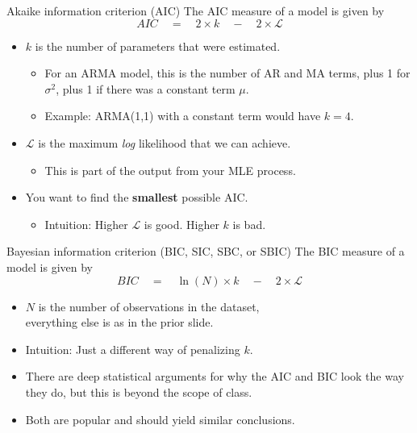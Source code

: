 \documentclass[t,12pt]{beamer}
\begin{document}
\begin{frame}[c]{Akaike information criterion (AIC)}
The AIC measure of a model is given by
$$
AIC \quad = \quad 2 \times k \quad - \quad 2 \times \mathscr{L}
$$
\begin{itemize}
\vspace{-0.2in}
\item $k$ is the number of parameters that were estimated.
\begin{itemize}
\item For an ARMA model, this is the number of AR and MA terms, plus 1 for $\sigma^2$, plus 1 if there was a constant term $\mu$.
\item Example: ARMA(1,1) with a constant term would have $k=4$.
\end{itemize}
\medskip
\item $\mathscr{L}$ is the maximum \emph{log} likelihood that we can achieve.
\begin{itemize}
\item This is part of the output from your MLE process.
\end{itemize}
\medskip
\item You want to find the \textbf{smallest} possible AIC.
\begin{itemize}
\item Intuition: Higher $\mathscr{L}$ is good. Higher $k$ is bad.
\end{itemize}
\end{itemize}
\end{frame}

\begin{frame}[c]{Bayesian information criterion (BIC, SIC, SBC, or SBIC)}
The BIC measure of a model is given by
$$
BIC \quad = \quad \ln(N) \times k \quad - \quad 2 \times \mathscr{L}
$$
\begin{itemize}
\vspace{-0.2in}
\item $N$ is the number of observations in the dataset,
\\ everything else is as in the prior slide.
\medskip
\item Intuition: Just a different way of penalizing $k$.
\medskip 
\item There are deep statistical arguments for why the AIC and BIC look the way they do, but this is beyond the scope of class.
\medskip
\item Both are popular and should yield similar conclusions.
\end{itemize}
\end{frame}
\end{document}
